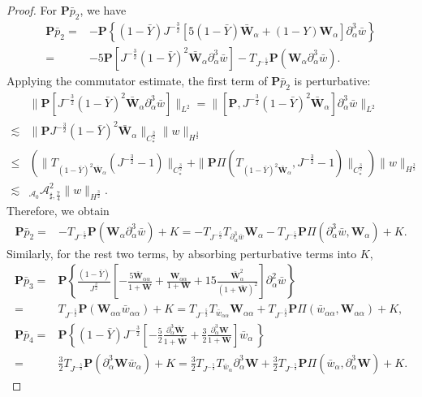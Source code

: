 \documentclass[10pt]{amsart}
\theoremstyle{remark}
\theoremstyle{definition}
\numberwithin{equation}{section}
\newcommand{\p}{\partial}
\newcommand{\al}{\alpha}
\newcommand{\f}{\frac}
\newcommand{\bw}{\mathbf{W}}
\newcommand{\nP}{{\mathbf P}}
\newcommand{\CalAZ}{{\mathcal{A}_0}}
\newcommand{\ASSharp}{{\mathcal{A}_{\sharp,\frac{7}{4}}^2}}
\begin{document}
\begin{proof}
For $\nP\bar{p}_2$, we have
\begin{equation*}
\begin{split}
\nP\bar{p}_2=&-\nP\left\{(1-\bar{Y})J^{-\f32}\left[5(1-\bar{Y})\bar{\mathbf{W}}_{\al}+(1-Y)\mathbf{W}_{\al}\right]\p_{\al}^3\bar{w} \right\}\\
=&-5\nP[J^{-\f32}(1-\bar{Y})^2\bar{\bw}_{\al}\p^3_{\al}\bar{w}] - T_{J^{-\f52}}\nP(\bw_{\al}\p^3_{\al}\bar{w}).
\end{split}
\end{equation*}
Applying the commutator estimate, the first term of $\nP\bar{p}_2$ is perturbative:
\begin{align*}
&\|\nP[J^{-\f32}(1-\bar{Y})^2\bar{\bw}_{\al}\p^3_{\al}\bar{w}]\|_{L^2}=\|[\nP,J^{-\f32}(1-\bar{Y})^2\bar{\bw}_{\al}]\p^3_{\al}\bar{w}\|_{L^2}\\
\lesssim&\|\nP J^{-\f32}(1-\bar{Y})^2\bar{\bw}_{\al}\|_{C^{\f32}_*}\|w\|_{H^{\f32}}\\
\leq&\left(\|T_{(1-\bar{Y})^2\bar{\bw}_{\al}}(J^{-\f32}-1)\|_{C^{\f32}_*}+\|\nP\Pi(T_{(1-\bar{Y})^2\bar{\bw}_{\al}},J^{-\f32}-1)\|_{C^{\f32}_*}\right)\|w\|_{H^{\f32}}\\
\lesssim&_{\CalAZ}  \ASSharp \| w\|_{H^\f32}.
\end{align*}
Therefore, we obtain
\begin{equation*}
\begin{split}
\nP\bar{p}_2
=&- T_{J^{-\f52}} \nP(\bw_{\al}\p^3_{\al}\bar{w})+K = - T_{J^{-\f52}}T_{\p^3_{\al}\bar{w}}\bw_\al - T_{J^{-\f52}} \nP \Pi(\p^3_{\al}\bar{w}, \bw_\al) + K.
\end{split}
\end{equation*}
Similarly, for the rest two terms, by absorbing perturbative terms into $K$,
\begin{equation*}
\begin{split}
\nP\bar{p}_3=&\nP \left\{\f{(1-\bar{Y})}{J^{\f32}}\left[-\f{5\bar{\mathbf{W}}_{\al\al}}{1+\bar{\mathbf{W}}}+\f{\mathbf{W}_{\al\al}}{1+\mathbf{W}}+15\f{\bar{\mathbf{W}}^2_{\al}}{(1+\bar{\mathbf{W}})^2}\right]\p_{\al}^2\bar{w}\right\}\\
=& T_{J^{-\f52}}\nP(\bw_{\al\al}\bar{w}_{\al\al})+K = T_{J^{-\f52}} T_{\bar{w}_{\al\al}}\bw_{\al\al} + T_{J^{-\f52}}\nP \Pi(\bar{w}_{\al\al},\bw_{\al\al}) + K,\\
\nP\bar{p}_4=&\nP \left\{(1-\bar{Y})J^{-\f32}\left[-\f52\f{\p^3_{\al}\bar{\mathbf{W}}}{1+\bar{\mathbf{W}}}+\f32\f{\p^3_{\al}\mathbf{W}}{1+\mathbf{W}}\right]\bar{w}_{\al}\, \right\}\\
=&\f32T_{J^{-\f52}} \nP (\p^3_{\al}\bw \bar{w}_{\al})+K = \f32T_{J^{-\f52}}T_{\bar{w}_{\al}} \p^3_{\al}\bw + \f32T_{J^{-\f52}}\nP \Pi(\bar{w}_{\al},\p^3_{\al}\bw) +K.

\end{split}
\end{equation*}
\end{proof}
\end{document}
